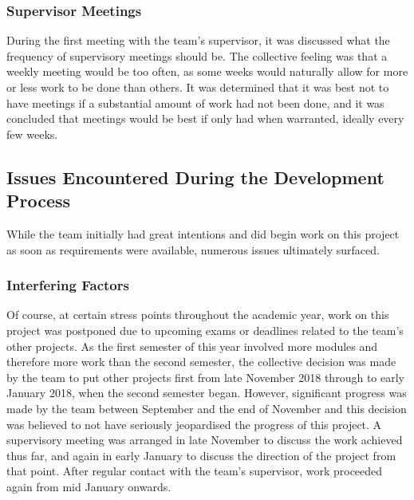 \subsubsection{Supervisor Meetings}
During the first meeting with the team's supervisor, it was discussed what the frequency of supervisory meetings should be. The collective feeling was that a weekly meeting would be too often, as some weeks would naturally allow for more or less work to be done than others. It was determined that it was best not to have meetings if a substantial amount of work had not been done, and it was concluded that meetings would be best if only had when warranted, ideally every few weeks.

\subsection{Issues Encountered During the Development Process}\label{issuesencountered}
While the team initially had great intentions and did begin work on this project as soon as requirements were available, numerous issues ultimately surfaced.

\subsubsection{Interfering Factors}
Of course, at certain stress points throughout the academic year, work on this project was postponed due to upcoming exams or deadlines related to the team's other projects. As the first semester of this year involved more modules and therefore more work than the second semester, the collective decision was made by the team to put other projects first from late November 2018 through to early January 2018, when the second semester began. However, significant progress was made by the team between September and the end of November and this decision was believed to not have seriously jeopardised the progress of this project. A supervisory meeting was arranged in late November to discuss the work achieved thus far, and again in early January to discuss the direction of the project from that point. After regular contact with the team's supervisor, work proceeded again from mid January onwards.

